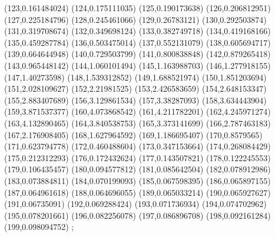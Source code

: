 {    (123,0.161484024)
    (124,0.175111035)
    (125,0.190173638)
    (126,0.206812951)
    (127,0.225184796)
    (128,0.245461066)
    (129,0.26783121)
    (130,0.292503874)
    (131,0.319708674)
    (132,0.349698124)
    (133,0.382749718)
    (134,0.419168166)
    (135,0.459287784)
    (136,0.503475014)
    (137,0.552131079)
    (138,0.605694717)
    (139,0.664644948)
    (140,0.729503799)
    (141,0.800838848)
    (142,0.879265418)
    (143,0.965448142)
    (144,1.060101494)
    (145,1.163988703)
    (146,1.277918155)
    (147,1.40273598)
    (148,1.539312852)
    (149,1.688521974)
    (150,1.851203694)
    (151,2.028109627)
    (152,2.21981525)
    (153,2.426583659)
    (154,2.648153347)
    (155,2.883407689)
    (156,3.129861534)
    (157,3.38287093)
    (158,3.634443904)
    (159,3.871537377)
    (160,4.073868542)
    (161,4.211782201)
    (162,4.245971274)
    (163,4.132890465)
    (164,3.840538753)
    (165,3.373141699)
    (166,2.787463183)
    (167,2.176908405)
    (168,1.627964592)
    (169,1.186695407)
    (170,0.8579565)
    (171,0.623794778)
    (172,0.460488604)
    (173,0.347153664)
    (174,0.268084429)
    (175,0.212312293)
    (176,0.172432624)
    (177,0.143507821)
    (178,0.122245553)
    (179,0.106435457)
    (180,0.094577812)
    (181,0.085642504)
    (182,0.078912986)
    (183,0.073884811)
    (184,0.070199093)
    (185,0.067598395)
    (186,0.065897155)
    (187,0.064961618)
    (188,0.064696055)
    (189,0.065033214)
    (190,0.065927627)
    (191,0.06735091)
    (192,0.069288424)
    (193,0.071736934)
    (194,0.074702962)
    (195,0.078201661)
    (196,0.082256078)
    (197,0.086896708)
    (198,0.092161284)
    (199,0.098094752)
};
